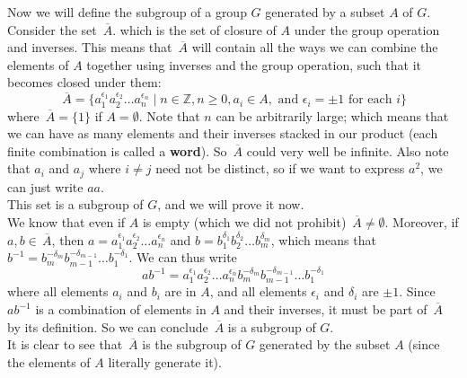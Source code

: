 \documentclass[12pt]{article}
\newcommand{\Z}{\mathbb{Z}}
\newcommand{\olsi}[1]{\,\overline{{#1}}}
\begin{document}
    Now we will define
    the subgroup of a group $G$ generated by a subset $A$ of $G$.
    Consider the set $\olsi{A}$.
    which is the set of closure of $A$
    under the group operation and inverses.
    This means that $\olsi{A}$ will contain
    all the ways we can combine the elements of $A$
    together using inverses and the group operation,
    such that it becomes closed under them:
    \[ \olsi{A} =
    \{ a_1^{\epsilon_1}a_2^{\epsilon_2} \dots a_n^{\epsilon_n} \mid
    n \in \Z, n \geqslant 0, a_i \in A,
    \text{ and } \epsilon_i = \pm 1 \text { for each } i  \} \]
    where $\olsi{A} = \{1\}$ if $A = \emptyset$.
    Note that $n$ can be arbitrarily large;
    which means that we can have as many elements 
    and their inverses stacked in our product
    (each finite combination is called a \textbf{word}).
    So $\olsi{A}$ could very well be infinite.
    Also note that $a_i$ and $a_j$ where $i \neq j$
    need not be distinct,
    so if we want to express $a^2$, we can just write $aa$. \\
    This set is a subgroup of $G$,
    and we will prove it now. \\
    We know that even if $A$ is empty
    (which we did not prohibit)
    $\olsi{A} \neq \emptyset$.
    Moreover, if $a, b \in \olsi{A}$,
    then $a = a_1^{\epsilon_1}a_2^{\epsilon_2} \dots a_n^{\epsilon_n}$
    and $b = b_1^{\delta_1}b_2^{\delta_2} \dots b_m^{\delta_m}$,
    which means that $b^{-1} = b_m^{-\delta_m}b_{m-1}^{-\delta_{m-1}}
    \dots b_1^{-\delta_1}$.
    We can thus write
    \[ ab^{-1} = 
    a_1^{\epsilon_1}a_2^{\epsilon_2} \dots a_n^{\epsilon_n}
    b_m^{-\delta_m}b_{m-1}^{-\delta_{m-1}} \dots b_1^{-\delta_1} \]
    where all elements $a_i$ and $b_i$ are in $A$,
    and all elements $\epsilon_i$ and $\delta_i$ are $\pm 1$.
    Since $ab^{-1}$ is a combination of elements in $A$
    and their inverses,
    it must be part of $\olsi{A}$ by its definition.
    So we can conclude $\olsi{A}$ is a subgroup of $G$. \\
    It is clear to see that $\olsi{A}$
    is the subgroup of $G$ generated by the subset $A$
    (since the elements of $A$ literally generate it). \\
\end{document}
